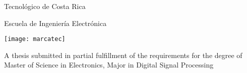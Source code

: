 
\thispagestyle{empty} 

\begin{center}

Tecnológico de Costa Rica

\par\vspace{1ex}

Escuela de Ingeniería Electrónica

\par\vspace{20mm}

\texttt{[image: marcatec]}

\par\vspace*{\fill}

{\large\bf{\scriptTitle}}

\par\vspace*{\fill}

A thesis submitted in partial fulfillment of the requirements for the
degree of
%
Master of Science in Electronics, Major in 
%
Digital Signal Processing

\par\vspace{20mm}

\scriptAuthor

\vspace*{\fill}

\end{center}
\newpage 
\cleardoublepage 



